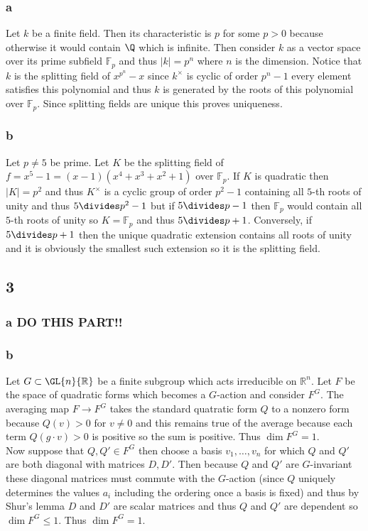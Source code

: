 \documentclass[12pt]{article}
\newcommand{\R}{\mathbb{R}}
\renewcommand{\F}{\mathbb{F}}
\begin{document}
\subsubsection{a}

Let $k$ be a finite field. Then its characteristic is $p$ for some $p > 0$ because otherwise it would contain $\Q$ which is infinite. Then consider $k$ as a vector space over its prime subfield $\F_p$ and thus $|k| = p^n$ where $n$ is the dimension. Notice that $k$ is the splitting field of $x^{p^n} - x$ since $k^\times$ is cyclic of order $p^n-1$ every element satisfies this polynomial and thus $k$ is generated by the roots of this polynomial over $\F_p$. Since splitting fields are unique this proves uniqueness. 

\subsubsection{b}

Let $p \neq 5$ be prime. Let $K$ be the splitting field of $f = x^5 - 1 = (x - 1)(x^4 + x^3 + x^2 + 1)$ over $\F_p$. If $K$ is quadratic then $|K| = p^2$ and thus $K^\times$ is a cyclic group of order $p^2 - 1$ containing all $5$-th roots of unity and thus $5 \divides p^2 - 1$ but if $5 \divides p - 1$ then $\F_p$ would contain all $5$-th roots of unity so $K = \F_p$ and thus $5 \divides p + 1$. Conversely, if $5 \divides p + 1$ then the unique quadratic extension contains all roots of unity and it is obviously the smallest such extension so it is the splitting field.

\subsection{3}

\subsubsection{a DO THIS PART!!}


\subsubsection{b}


Let $G \subset \GL{n}{\R}$ be a finite subgroup which acts irreducible on $\R^n$. Let $F$ be the space of quadratic forms which becomes a $G$-action and consider $F^G$. The averaging map $F \to F^G$ takes the standard quatratic form $Q$ to a nonzero form because $Q(v) > 0$ for $v \neq 0$ and this remains true of the average because each term $Q(g \cdot v) > 0$ is positive so the sum is positive. Thus $\dim{F^G} = 1$. 
\bigskip\\
Now suppose that $Q, Q' \in F^G$ then choose a basis $v_1, \dots, v_n$ for which $Q$ and $Q'$ are both diagonal with matrices $D, D'$. Then because $Q$ and $Q'$ are $G$-invariant these diagonal matrices must commute with the $G$-action (since $Q$ uniquely determines the values $a_i$ including the ordering once a basis is fixed) and thus by Shur's lemma $D$ and $D'$ are scalar matrices and thus $Q$ and $Q'$ are dependent so $\dim{F^G} \le 1$. Thus $\dim{F^G} = 1$.
\end{document}
